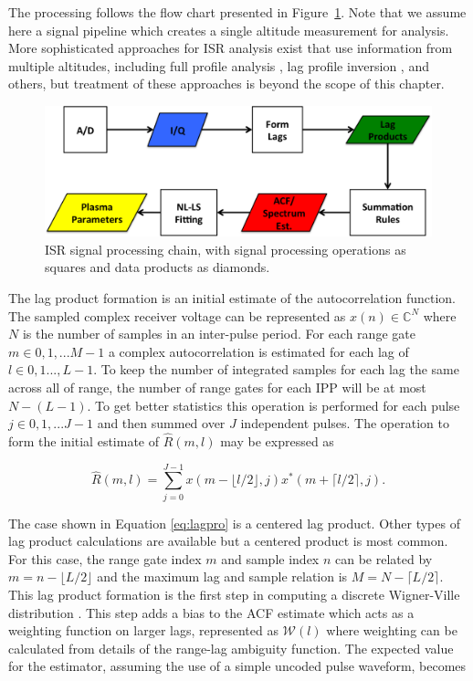  
The processing follows the flow chart presented in Figure~\ref{fig:chain}.  
Note that we assume here a signal pipeline which creates a single altitude measurement for analysis. 
More sophisticated approaches for ISR analysis exist that use information from multiple altitudes, including full profile analysis \citep{RDS:RDS3308}, lag profile inversion \citep{Virtanen:20082vx}, and others, but treatment of these approaches is beyond the scope of this chapter.
\begin{figure}[!t]
\centering
\includegraphics[width=5.5in]{datastackchain}
\caption{ISR signal processing chain, with signal processing operations as squares and data products as diamonds.}
\label{fig:chain}
\end{figure}
The lag product formation is an initial estimate of the autocorrelation function. The sampled complex receiver voltage can be represented as $x(n) \in\mathbb{C}^N$ where $N$ is the number of samples in an inter-pulse period. For each range gate $m\in 0,1,...M-1$ a complex autocorrelation is estimated for each lag of $l \in 0,1...,L-1$. To keep the number of integrated samples for each lag the same across all of range, the number of range gates for each IPP will be at most $N-(L-1)$. To get better statistics this operation is performed for each pulse $j\in 0,1,...J-1$ and then summed over $J$ independent pulses. The operation to form the initial estimate of $\widehat{R}(m,l)$ may be expressed as

\begin{equation}
\label{eq:lagpro}
\widehat{R}(m,l) = \displaystyle\sum\limits_{j=0}^{J-1} x(m-\lfloor l/2\rfloor,j)x^*(m+\lceil l/2 \rceil,j).
\end{equation}

The case shown in Equation \ref{eq:lagpro} is a centered lag product.  Other types of lag product calculations are available but a centered product is most common. For this case, the range gate index $m$ and sample index $n$ can be related by $m=n-\lfloor L/2\rfloor$ and the maximum lag and sample relation is $M=N-\lceil L/2 \rceil$.  This lag product formation is the first step in computing a discrete Wigner-Ville distribution \citep{TFAcohen}. This  step adds a bias to the ACF estimate which acts as a weighting function on larger lags, represented as $\mathcal{W}(l)$ where weighting can be calculated from details of the range-lag ambiguity function. The expected value for the estimator, assuming the use of a simple uncoded pulse waveform, becomes

